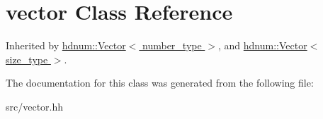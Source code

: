 \hypertarget{classstd_1_1vector}{
\section{vector Class Reference}
\label{classstd_1_1vector}
}


Inherited by \hyperlink{classhdnum_1_1Vector}{hdnum::Vector$<$ number\_\-type $>$}, and \hyperlink{classhdnum_1_1Vector}{hdnum::Vector$<$ size\_\-type $>$}.



The documentation for this class was generated from the following file:\begin{DoxyCompactItemize}
\item 
src/vector.hh\end{DoxyCompactItemize}
